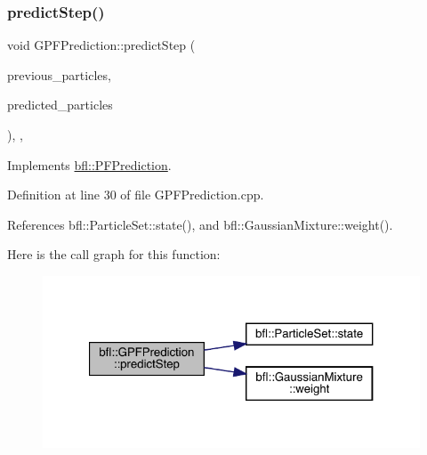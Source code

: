 \mbox{\label{classbfl_1_1GPFPrediction_a9eca49102486401afeff748c37438ca3}} 
\subsubsection{\texorpdfstring{predict\+Step()}{predictStep()}}
{\footnotesize\ttfamily void G\+P\+F\+Prediction\+::predict\+Step (\begin{DoxyParamCaption}\item[{const \mbox{\hyperlink{classbfl_1_1ParticleSet}{bfl\+::\+Particle\+Set}} \&}]{previous\+\_\+particles,  }\item[{\mbox{\hyperlink{classbfl_1_1ParticleSet}{bfl\+::\+Particle\+Set}} \&}]{predicted\+\_\+particles }\end{DoxyParamCaption})\hspace{0.3cm}{\ttfamily [override]}, {\ttfamily [protected]}, {\ttfamily [virtual]}}



Implements \mbox{\hyperlink{classbfl_1_1PFPrediction_ade49953e2beed6d12f9716254ccbba71}{bfl\+::\+P\+F\+Prediction}}.



Definition at line 30 of file G\+P\+F\+Prediction.\+cpp.



References bfl\+::\+Particle\+Set\+::state(), and bfl\+::\+Gaussian\+Mixture\+::weight().

Here is the call graph for this function\+:
\nopagebreak
\begin{figure}[H]
\begin{center}
\leavevmode
\includegraphics[width=321pt]{classbfl_1_1GPFPrediction_a9eca49102486401afeff748c37438ca3_cgraph}
\end{center}
\end{figure}
\mbox{\label{classbfl_1_1PFPrediction_ada843698204584e97d4ff6728c8e8264}} 
